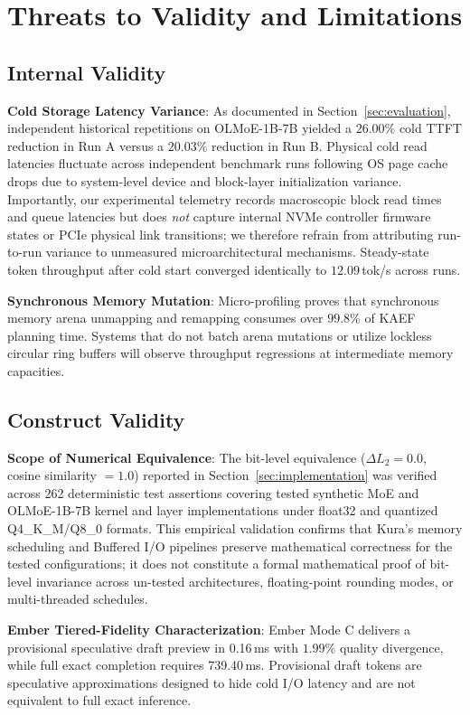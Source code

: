 \section{Threats to Validity and Limitations}
\label{sec:threats}

\subsection{Internal Validity}
\textbf{Cold Storage Latency Variance}: As documented in Section~\ref{sec:evaluation}, independent historical repetitions on OLMoE-1B-7B yielded a $26.00\%$ cold TTFT reduction in Run A versus a $20.03\%$ reduction in Run B. Physical cold read latencies fluctuate across independent benchmark runs following OS page cache drops due to system-level device and block-layer initialization variance. Importantly, our experimental telemetry records macroscopic block read times and queue latencies but does \emph{not} capture internal NVMe controller firmware states or PCIe physical link transitions; we therefore refrain from attributing run-to-run variance to unmeasured microarchitectural mechanisms. Steady-state token throughput after cold start converged identically to $12.09$\,tok/s across runs.

\textbf{Synchronous Memory Mutation}: Micro-profiling proves that synchronous memory arena unmapping and remapping consumes over $99.8\%$ of KAEF planning time. Systems that do not batch arena mutations or utilize lockless circular ring buffers will observe throughput regressions at intermediate memory capacities.

\subsection{Construct Validity}
\textbf{Scope of Numerical Equivalence}: The bit-level equivalence ($\Delta L_2 = 0.0$, cosine similarity $= 1.0$) reported in Section~\ref{sec:implementation} was verified across 262 deterministic test assertions covering tested synthetic MoE and OLMoE-1B-7B kernel and layer implementations under float32 and quantized Q4\_K\_M/Q8\_0 formats. This empirical validation confirms that Kura's memory scheduling and Buffered I/O pipelines preserve mathematical correctness for the tested configurations; it does not constitute a formal mathematical proof of bit-level invariance across un-tested architectures, floating-point rounding modes, or multi-threaded schedules.

\textbf{Ember Tiered-Fidelity Characterization}: Ember Mode C delivers a provisional speculative draft preview in 0.16\,ms with $1.99\%$ quality divergence, while full exact completion requires 739.40\,ms. Provisional draft tokens are speculative approximations designed to hide cold I/O latency and are not equivalent to full exact inference.

